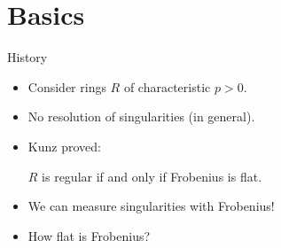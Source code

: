 \documentclass[xcolor=dvipsnames]{beamer}
\subtitle
{The {\tt TestIdeals} package for Macaulay2}
\author[BeBoBrElHeKaKaMaMaMoRoScSmTeWi] %
{Erin Bela, Alberto F. Boix, Juliette Bruce, Drew Ellingson, Daniel Hern\'andez, Zhibek Kadyrsizova, Mordechai Katzman, Sara Malec, Matthew Mastroeni, Maral Mostafazadehfard, Marcus Robinson, Karl Schwede\inst{1}, Daniel Smolkin, Pedro Teixeira, Emily Witt}
\institute[AMS Sectional Meeting, University of Arkansas] %
{
  \inst{1}%
  Department of Mathematics\\
  University of Utah}
\date[2018] %
{AMS Sectional Meeting, University of Arkansas\\2018}
\theoremstyle{remark}
\begin{document}
\begin{frame}
  \titlepage
\end{frame}






\section{Basics}

\begin{frame}[c]{History}
\begin{itemize}
\item<1-> Consider rings $R$ of characteristic $p > 0$.
\item<2-> No resolution of singularities (in general).
\item<3-> Kunz proved:
\vskip 3pt
\begin{theorem}[Kunz]
$R$ is regular if and only if Frobenius is flat.
\end{theorem}
\item<4->  We can measure singularities with Frobenius!
\item<5->  How flat is Frobenius?
\end{itemize}
\end{frame}
\end{document}

